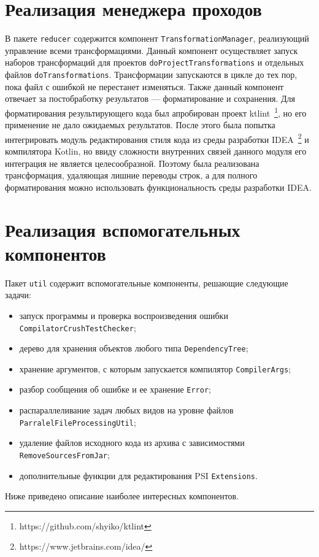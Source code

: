 \section{Реализация менеджера проходов}
В пакете \texttt{reducer} содержится компонент \texttt{TransformationManager}, реализующий управление всеми трансформациями. Данный компонент осуществляет запуск наборов трансформаций для проектов \texttt{doProjectTransformations} и отдельных файлов \texttt{doTransformations}. Трансформации запускаются в цикле до тех пор, пока файл с ошибкой не перестанет изменяться. Также данный компонент отвечает за постобработку результатов --- форматирование и сохранения.  Для форматирования результирующего кода был апробирован проект ktlint~\footnote{https://github.com/shyiko/ktlint}, но его применение не дало ожидаемых результатов. После этого была попытка интегрировать модуль редактирования стиля кода из среды разработки IDEA~\footnote{https://www.jetbrains.com/idea/} и компилятора Kotlin, но ввиду сложности внутренних связей данного модуля его интеграция не является целесообразной. Поэтому была реализована трансформация, удаляющая лишние переводы строк, а для полного форматирования можно использовать функциональность среды разработки IDEA. 

\section{Реализация вспомогательных компонентов}
Пакет \texttt{util} содержит вспомогательные компоненты, решающие следующие задачи:
\begin{itemize}
	\item запуск программы и проверка воспроизведения ошибки \texttt{CompilatorCrushTestChecker};
	\item дерево для хранения объектов любого типа \texttt{DependencyTree};
	\item хранение аргументов, с которым запускается компилятор \texttt{CompilerArgs};
	\item разбор сообщения об ошибке и ее хранение \texttt{Error};
	\item распараллеливание задач любых видов на уровне файлов \texttt{ParralelFileProcessingUtil};
	\item удаление файлов исходного кода из архива с зависимостями \texttt{RemoveSourcesFromJar};
	\item дополнительные функции для редактирования PSI \texttt{Extensions}.
\end{itemize}
Ниже приведено описание наиболее интересных компонентов.

